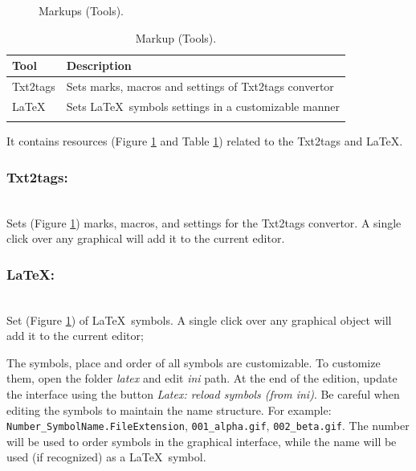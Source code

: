 \begin{figure}[H]
  \caption{Markups (Tools).}
  \label{fig:tools_markup_txt2tags_options}
\end{figure}

\begin{table}
  \begin{footnotesize}
    \begin{tabularx}{\textwidth}{lX}\\
      \hline
      \textbf{Tool} & \textbf{Description} \\
      \hline
      Txt2tags & Sets marks, macros and settings of Txt2tags convertor \\
      \LaTeX & Sets \LaTeX~symbols settings in a customizable manner \\
      \hline
      \\
    \end{tabularx}
  \end{footnotesize}
  \caption{Markup (Tools).}
  \label{tab:tools_markup}
\end{table}

It contains resources
(Figure \ref{fig:tools_markup_txt2tags_options} and
Table \ref{tab:tools_markup})
related to the Txt2tags and \LaTeX.


\subsubsection{Txt2tags:}\\
Sets
(Figure \ref{fig:tools_markup_txt2tags_options})
marks, macros, and settings for the Txt2tags convertor.
A single click over any graphical will add it to the current editor.


\subsubsection{\LaTeX:}\\
Set
(Figure \ref{fig:tools_markup_txt2tags_options})
of \LaTeX~symbols. A single click over any graphical object
will add it to the current editor;

The symbols, place and order of all symbols are customizable.
To customize them, open the folder \textit{latex} and edit
\textit{ini} path. At the end of the edition, update the interface
using the button \textit{Latex: reload symbols (from ini)}. Be careful
when editing the symbols to maintain the name structure.
For example: \texttt{Number\_SymbolName.FileExtension},
\texttt{001\_alpha.gif}, \texttt{002\_beta.gif}. The number
will be used to order symbols in the graphical interface,
while the name will be used (if recognized) as a \LaTeX~symbol.


